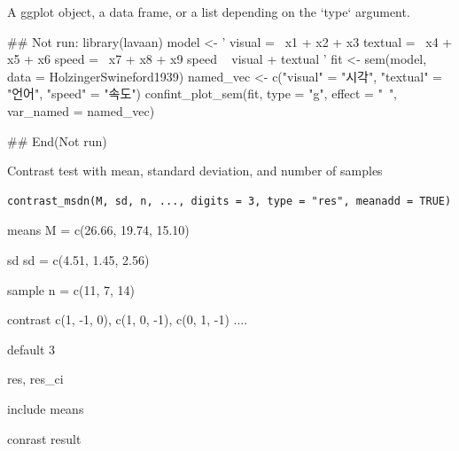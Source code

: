 \documentclass[a4paper]{book}
\begin{document}
%
\begin{Value}
A ggplot object, a data frame, or a list depending on the `type` argument.
\end{Value}
%
\begin{Examples}
\begin{ExampleCode}
## Not run: 
library(lavaan)
model <- '
  visual  =~ x1 + x2 + x3
  textual =~ x4 + x5 + x6
  speed   =~ x7 + x8 + x9
  speed ~ visual + textual
'
fit <- sem(model, data = HolzingerSwineford1939)
named_vec <- c("visual" = "시각", "textual" = "언어", "speed" = "속도")
confint_plot_sem(fit, type = "g", effect = "~", var_named = named_vec)

## End(Not run)
\end{ExampleCode}
\end{Examples}
%
\begin{Description}
Contrast test with mean, standard deviation, and number of samples
\end{Description}
%
\begin{Usage}
\begin{verbatim}
contrast_msdn(M, sd, n, ..., digits = 3, type = "res", meanadd = TRUE)
\end{verbatim}
\end{Usage}
%
\begin{Arguments}
\begin{ldescription}
\item[\code{M}] means M = c(26.66, 19.74, 15.10)

\item[\code{sd}] sd  sd = c(4.51, 1.45, 2.56)

\item[\code{n}] sample  n = c(11, 7, 14)

\item[\code{...}] contrast c(1, -1,  0), c(1,  0, -1), c(0,  1, -1) ....

\item[\code{digits}] default 3

\item[\code{type}] res, res\_ci

\item[\code{meanadd}] include means
\end{ldescription}
\end{Arguments}
%
\begin{Value}
conrast result
\end{Value}
\end{document}
